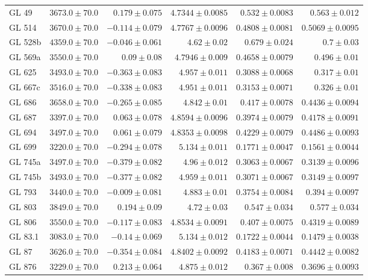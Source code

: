 \begin{longtable*}{lrrrrr}
GL 49 & $3673.0\pm 70.0$ & $0.179\pm 0.075$ & $4.7344\pm 0.0085$ & $0.532\pm 0.0083$ & $0.563\pm 0.012$ \\ 
GL 514 & $3670.0\pm 70.0$ & $-0.114\pm 0.079$ & $4.7767\pm 0.0096$ & $0.4808\pm 0.0081$ & $0.5069\pm 0.0095$ \\ 
GL 528b & $4359.0\pm 70.0$ & $-0.046\pm 0.061$ & $4.62\pm 0.02$ & $0.679\pm 0.024$ & $0.7\pm 0.03$ \\ 
GL 569a & $3550.0\pm 70.0$ & $0.09\pm 0.08$ & $4.7946\pm 0.009$ & $0.4658\pm 0.0079$ & $0.496\pm 0.01$ \\ 
GL 625 & $3493.0\pm 70.0$ & $-0.363\pm 0.083$ & $4.957\pm 0.011$ & $0.3088\pm 0.0068$ & $0.317\pm 0.01$ \\ 
GL 667c & $3516.0\pm 70.0$ & $-0.338\pm 0.083$ & $4.951\pm 0.011$ & $0.3153\pm 0.0071$ & $0.326\pm 0.01$ \\ 
GL 686 & $3658.0\pm 70.0$ & $-0.265\pm 0.085$ & $4.842\pm 0.01$ & $0.417\pm 0.0078$ & $0.4436\pm 0.0094$ \\ 
GL 687 & $3397.0\pm 70.0$ & $0.063\pm 0.078$ & $4.8594\pm 0.0096$ & $0.3974\pm 0.0079$ & $0.4178\pm 0.0091$ \\ 
GL 694 & $3497.0\pm 70.0$ & $0.061\pm 0.079$ & $4.8353\pm 0.0098$ & $0.4229\pm 0.0079$ & $0.4486\pm 0.0093$ \\ 
GL 699 & $3220.0\pm 70.0$ & $-0.294\pm 0.078$ & $5.134\pm 0.011$ & $0.1771\pm 0.0047$ & $0.1561\pm 0.0044$ \\ 
GL 745a & $3497.0\pm 70.0$ & $-0.379\pm 0.082$ & $4.96\pm 0.012$ & $0.3063\pm 0.0067$ & $0.3139\pm 0.0096$ \\ 
GL 745b & $3493.0\pm 70.0$ & $-0.377\pm 0.082$ & $4.959\pm 0.011$ & $0.3071\pm 0.0067$ & $0.3149\pm 0.0097$ \\ 
GL 793 & $3440.0\pm 70.0$ & $-0.009\pm 0.081$ & $4.883\pm 0.01$ & $0.3754\pm 0.0084$ & $0.394\pm 0.0097$ \\ 
GL 803 & $3849.0\pm 70.0$ & $0.194\pm 0.09$ & $4.72\pm 0.03$ & $0.547\pm 0.034$ & $0.577\pm 0.034$ \\ 
GL 806 & $3550.0\pm 70.0$ & $-0.117\pm 0.083$ & $4.8534\pm 0.0091$ & $0.407\pm 0.0075$ & $0.4319\pm 0.0089$ \\ 
GL 83.1 & $3083.0\pm 70.0$ & $-0.14\pm 0.069$ & $5.134\pm 0.012$ & $0.1722\pm 0.0044$ & $0.1479\pm 0.0038$ \\ 
GL 87 & $3626.0\pm 70.0$ & $-0.354\pm 0.084$ & $4.8402\pm 0.0092$ & $0.4183\pm 0.0071$ & $0.4442\pm 0.0082$ \\ 
GL 876 & $3229.0\pm 70.0$ & $0.213\pm 0.064$ & $4.875\pm 0.012$ & $0.367\pm 0.008$ & $0.3696\pm 0.0093$ \\ 

\end{longtable*}
